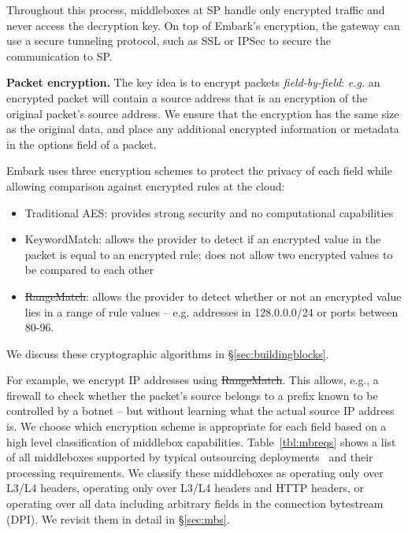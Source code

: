 \documentclass[letterpaper,twocolumn,10pt]{article}
\newcommand{\sys}{Embark\xspace} %
\newcommand{\eg}{{\it e.g.}}
\newenvironment{myitemize}
{ \begin{itemize}[nolistsep,leftmargin=0.15in]
  \setlength{\itemsep}{0.5pt}
  \setlength{\parskip}{0.9pt}
  \setlength{\parsep}{0.1pt}     }
{ \end{itemize}                  }
\providecommand{\DIFaddtex}[1]{{\protect\color{blue}\uwave{#1}}} %
\providecommand{\DIFdeltex}[1]{{\protect\color{red}\sout{#1}}}                      %
\providecommand{\DIFaddbegin}{} %
\providecommand{\DIFaddend}{} %
\providecommand{\DIFdelbegin}{} %
\providecommand{\DIFdelend}{} %
\providecommand{\DIFadd}[1]{\texorpdfstring{\DIFaddtex{#1}}{#1}} %
\providecommand{\DIFdel}[1]{\texorpdfstring{\DIFdeltex{#1}}{}} %
\begin{document}
Throughout this process, middleboxes at SP handle only encrypted traffic and never access the decryption key. 
On top of \sys's encryption, the gateway can use a secure tunneling protocol, such as SSL or IPSec to secure the communication to SP.




\noindent\textbf{Packet encryption.}
The key idea is to encrypt packets {\it field-by-field}: \eg{}  an encrypted packet will contain a source address that is an encryption of the original packet's source address. We ensure that the encryption has the same size as the original data, and place any additional encrypted information or metadata in the options field of a packet. 

\sys uses three encryption schemes to protect the privacy of each field while allowing comparison against encrypted rules at the cloud: 

\begin{myitemize}
\item Traditional AES: provides strong security and no computational capabilities
\item KeywordMatch:  allows the provider to detect if an encrypted value in the packet is equal to an encrypted rule; does not allow two encrypted values to be compared to each other
\item \DIFdelbegin \DIFdel{RangeMatch}\DIFdelend \DIFaddbegin \DIFadd{PrefixMatch}\DIFaddend : allows the provider to detect whether or not an encrypted value lies in a range of rule values -- e.g. addresses in 128.0.0.0/24 or ports between 80-96.
\end{myitemize}
We discuss these cryptographic algorithms in \S\ref{sec:buildingblocks}.

For example, we encrypt IP addresses using \DIFdelbegin \DIFdel{RangeMatch}\DIFdelend \DIFaddbegin \DIFadd{PrefixMatch}\DIFaddend . This allows, e.g., a firewall to check whether the packet's source belongs to a prefix known to be controlled by a botnet -- but without learning what the actual source IP address is.
We choose which encryption scheme is appropriate for each field based on a high level classification of middlebox capabilities.
Table~\ref{tbl:mbreqs} shows a list of all middleboxes supported by typical outsourcing deployments~\cite{aplomb} and their processing requirements.
We classify these middleboxes as operating only over L3/L4 headers, operating only over L3/L4 headers and HTTP headers, or operating over all data including arbitrary fields in the connection bytestream (DPI).
We revisit them in detail in \S\ref{sec:mbs}.
\end{document}
